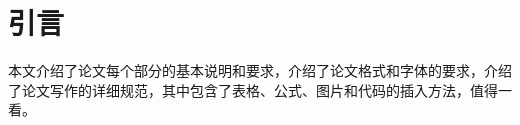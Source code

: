 \chapter{引言}
\label{chap:references}
\par 本文介绍了论文每个部分的基本说明和要求，介绍了论文格式和字体的要求，介绍了论文写作的详细规范，其中包含了表格、公式、图片和代码的插入方法，值得一看。